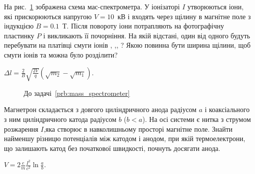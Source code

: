 \begin{problem}\label{prb:mass_spectrometer}%
На рис.~\ref{mass_spectrometer} зображена схема мас-спектрометра. У іонізаторі $I$ утворюються іони, які прискорюються напругою $V = 10$~кВ і входять через щілину в магнітне поле з індукцією $B = 0.1$~Т. Після повороту іони потрапляють на фотографічну пластинку $P$ і викликають її почорніння. На якій відстані, один від одного будуть перебувати на платівці смуги іонів , ,, ? Якою повинна бути ширина щілини, щоб смуги іонів  та  можна було розділити? 
\begin{solution}
	$\Delta l = \frac{2}{B}\sqrt{\frac{2V}{q}} \left( \sqrt{m_2} - \sqrt{m_1} \right) $.
\end{solution}
\end{problem}
\begin{figure}[h!]\centering
\caption{До задачі~\ref{prb:mass_spectrometer}}
\label{mass_spectrometer}
\end{figure}

\begin{problem}
Магнетрон складається з довгого циліндричного анода радіусом $a$ і коаксіального з ним циліндричного катода радіусом $b$ ($b < a $). На осі системи є нитка з струмом розжарення $I$,яка створює в навколишньому просторі магнітне поле. Знайти найменшу різницю потенціалів між катодом і анодом, при якій термоелектрони, що залишають катод без початкової швидкості, почнуть досягати анода.
\begin{solution}
	$V = 2\frac{e}{m}\frac{I^2}{c^2}\ln\frac{a}{b}$.
\end{solution}
\end{problem}


